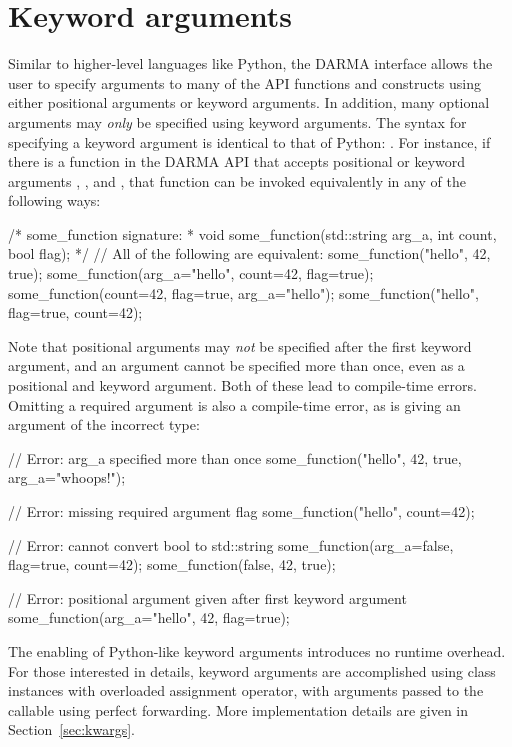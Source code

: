 \section{Keyword arguments}
\label{sec:keyword}
Similar to higher-level languages like Python, the DARMA \CC{} interface allows the user
to specify arguments to many of the \gls{API} functions and constructs using
either \glspl{positional argument}
or \glspl{keyword argument}. In addition, many optional arguments may {\em only} be specified using
\glspl{keyword argument}. The syntax for specifying a \gls{keyword argument} is identical to that
of Python: .  For instance, if there is 
a function  in the DARMA \gls{API} that accepts 
positional or \glspl{keyword argument} , 
, and , that function can be invoked 
equivalently in any of the following ways:
\begin{CppCode}
/* some_function signature:
 *  void some_function(std::string arg_a, int count, bool flag);
 */
// All of the following are equivalent:
some_function("hello", 42, true);
some_function(arg_a="hello", count=42, flag=true);
some_function(count=42, flag=true, arg_a="hello");
some_function("hello", flag=true, count=42);
\end{CppCode}
Note that \glspl{positional argument} may {\em not} be specified after the
first \gls{keyword argument},
and an argument cannot be specified more than once, even as a positional and
\gls{keyword argument}.  Both of these lead to compile-time errors. Omitting a required argument is 
also a compile-time error, as is giving an argument of the incorrect type: 
\begin{CppCode}
// Error: arg_a specified more than once
some_function("hello", 42, true, arg_a="whoops!");

// Error: missing required argument flag
some_function("hello", count=42);

// Error: cannot convert bool to std::string
some_function(arg_a=false, flag=true, count=42);
some_function(false, 42, true);

// Error: positional argument given after first keyword argument
some_function(arg_a="hello", 42, flag=true);
\end{CppCode}
The enabling of Python-like \glspl{keyword argument} introduces no runtime overhead.
For those interested in \CC{} details, \glspl{keyword argument} are accomplished using
 class instances with overloaded assignment operator,
with arguments passed to the callable using perfect forwarding.
More implementation details are given in Section~\ref{sec:kwargs}.  

